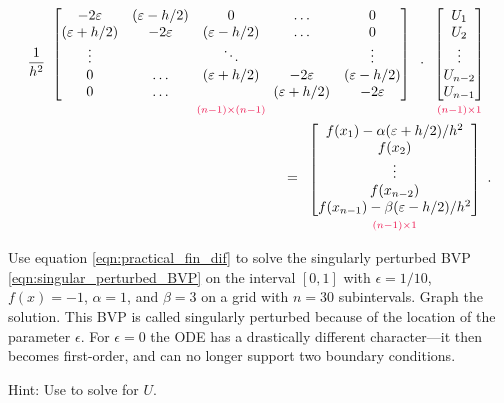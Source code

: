 \begin{align}
    \label{eqn:practical_fin_dif}
    \begin{split}
\frac{1}{h^2}
\begin{array}{c}
\begin{bmatrix}-2\epsilon & (\epsilon - h/2) &0&\hdots &0 \\ (\epsilon + h/2) &-2\epsilon & (\epsilon - h/2) &\hdots &0\\ \vdots &  & \ddots & &\vdots \\
0 & \hdots & (\epsilon + h/2) &-2\epsilon & (\epsilon - h/2) \\ 0 & \hdots & & (\epsilon + h/2) &-2\epsilon
\end{bmatrix}\\
{\scriptstyle\textcolor{red}{(n-1)\times(n-1)}}
\end{array}
\cdot
\begin{array}{c}
\begin{bmatrix}U_1\\U_2\\ \vdots \\U_{n-2} \\U_{n-1}\end{bmatrix}\\
{\scriptstyle\textcolor{red}{(n-1)\times1}}
\end{array}\\
 =
 \begin{array}{c}
 \begin{bmatrix}f(x_1) -\alpha(\epsilon + h/2)/h^2 \\f(x_2)\\ \vdots \\ f(x_{n-2})\\ f(x_{n-1})-\beta(\epsilon - h/2)/h^2 \end{bmatrix}\\
 {\scriptstyle\textcolor{red}{(n-1)\times1}}
 \end{array}.
    \end{split}
\end{align}



\begin{problem}
Use equation \eqref{eqn:practical_fin_dif} to solve the singularly perturbed BVP \eqref{eqn:singular_perturbed_BVP} on the interval $[0,1]$ with $\epsilon = 1/10$, $f(x) = -1$, $\alpha=1$, and $\beta=3$ on a grid with $n=30$ subintervals.
Graph the solution.
This BVP is called singularly perturbed because of the location of the parameter $\epsilon$.
For $\epsilon = 0$ the ODE has a drastically different character---it then becomes first-order, and can no longer support two boundary conditions.
    \label{prob:finitedifference2:prob1}

Hint: Use  to solve for $U$.
\end{problem}

